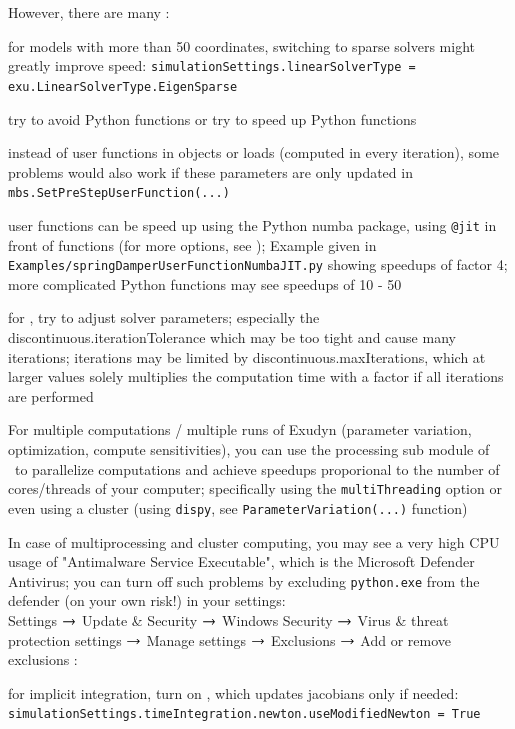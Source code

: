 \noindent However, there are many :
\bi
  \item for models with more than 50 coordinates, switching to sparse solvers might greatly improve speed: \texttt{simulationSettings.linearSolverType = exu.LinearSolverType.EigenSparse}
  \item try to avoid Python functions or try to speed up Python functions
  \item instead of user functions in objects or loads (computed in every iteration), some problems would also work if these parameters are only updated in \texttt{mbs.SetPreStepUserFunction(...)}
  \item user functions can be speed up using the Python numba package, using \texttt{@jit} in front of functions (for more options, see ); Example given in \texttt{Examples/springDamperUserFunctionNumbaJIT.py} showing speedups of factor 4; more complicated Python functions may see speedups of 10 - 50
  \item for , try to adjust solver parameters; especially the discontinuous.iterationTolerance which may be too tight and cause many iterations; iterations may be limited by discontinuous.maxIterations, which at larger values solely multiplies the computation time with a factor if all iterations are performed
  \item For multiple computations / multiple runs of Exudyn (parameter variation, optimization, compute sensitivities), you can use the processing sub module of \codeName\ to parallelize computations and achieve speedups proporional to the number of cores/threads of your computer; specifically using the \texttt{multiThreading} option or even using a cluster (using \texttt{dispy}, see \texttt{ParameterVariation(...)} function)
  \item In case of multiprocessing and cluster computing, you may see a very high CPU usage of "Antimalware Service Executable", which is the Microsoft Defender Antivirus; you can turn off such problems by excluding \texttt{python.exe} from the defender (on your own risk!) in your settings:\\
  Settings $\rightarrow$ Update \& Security $\rightarrow$ Windows Security $\rightarrow$ Virus \& threat protection settings $\rightarrow$ Manage settings $\rightarrow$ Exclusions $\rightarrow$ Add or remove exclusions 
\ei
{}:
\bi
  \item for implicit integration, turn on , which updates jacobians only if needed: \texttt{simulationSettings.timeIntegration.newton.useModifiedNewton = True}
